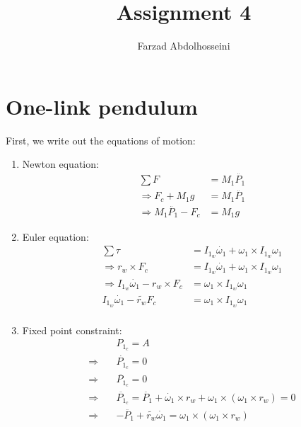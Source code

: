\documentclass[a4paper,11pt]{article}
\title{Assignment 4}
\author{Farzad Abdolhosseini}
\begin{document}
\maketitle

\section{One-link pendulum}
First, we write out the equations of motion:
\begin{enumerate}
  \item Newton equation:
    \begin{align*}
      \sum F &= M_1 \ddot{P_1}\\
      \Rightarrow F_c + M_1 g &= M_1 \ddot{P_1}\\
      \Rightarrow M_1 \ddot{P_1} - F_c &= M_1 g
    \end{align*}
    
  \item Euler equation:
    \begin{align*}
      \sum \tau &= I_{1_w} \dot{\omega_1} + \omega_1 \times I_{1_w} \omega_1\\
      \Rightarrow r_w \times F_c &= I_{1_w} \dot{\omega_1} + \omega_1 \times I_{1_w} \omega_1\\
      \Rightarrow I_{1_w} \dot{\omega_1} - r_w \times F_c &= \omega_1 \times I_{1_w} \omega_1\\
 I_{1_w} \dot{\omega_1} - \widetilde{r_w} F_c &= \omega_1 \times I_{1_w} \omega_1\\
    \end{align*}
    
  \item Fixed point constraint:
    \begin{align*}
      &P_{1_c} = A\\
      \Rightarrow\quad &\dot{P_{1_c}} = 0\\
      \Rightarrow\quad &\ddot{P_{1_c}} = 0\\
      \Rightarrow\quad &\ddot{P_{1_c}} = \ddot{P_1} + \dot{\omega_1} \times r_w + \omega_1 \times (\omega_1 \times r_w) = 0\\
      \Rightarrow\quad &-\ddot{P_1} + \widetilde{r_w}\dot{\omega_1} = \omega_1 \times (\omega_1 \times r_w)\\
    \end{align*}
\end{enumerate}
\end{document}
